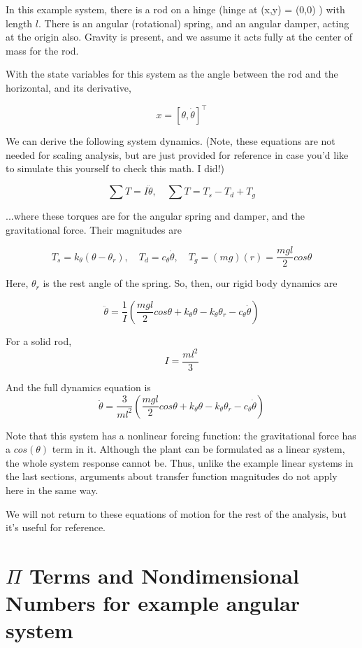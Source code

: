 \documentclass[12pt,letterpaper]{article}
\begin{document}
In this example system, there is a rod on a hinge (hinge at (x,y) = (0,0) ) with length $l$.
There is an angular (rotational) spring, and an angular damper, acting at the origin also.
Gravity is present, and we assume it acts fully at the center of mass for the rod.


With the state variables for this system as the angle between the rod and the horizontal, and its derivative,

\[
x = [\theta, \dot \theta]^\top
\]

We can derive the following system dynamics. 
(Note, these equations are not needed for scaling analysis, but are just provided for reference in case you'd like to simulate this yourself to check this math. I did!)

\[
\sum T = I \ddot \theta, \quad \sum T = T_s - T_d + T_g
\]

...where these torques are for the angular spring and damper, and the gravitational force. Their magnitudes are

\[
T_s = k_{\theta}(\theta - \theta_r), \quad T_d = c_{\theta} \dot \theta, \quad T_g = (mg)(r) = \frac{mgl}{2} cos \theta
\]

Here, $\theta_r$ is the rest angle of the spring. So, then, our rigid body dynamics are

\[
\ddot \theta = \frac{1}{I} (\frac{mgl}{2} cos \theta + k_{\theta} \theta - k_{\theta} \theta_r - c_{\theta} \dot \theta )
\]

For a solid rod,
\[
I = \frac{m l^2}{3}
\]


And the full dynamics equation is
\begin{equation}\label{eqn:dynamics_soln}
\ddot \theta = \frac{3}{m l^2} (\frac{mgl}{2} cos \theta + k_{\theta} \theta - k_{\theta} \theta_r - c_{\theta} \dot \theta )
\end{equation}

Note that this system has a nonlinear forcing function: the gravitational force has a $cos(\theta)$ term in it.
Although the plant can be formulated as a linear system, the whole system response cannot be.
Thus, unlike the example linear systems in the last sections, arguments about transfer function magnitudes do not apply here in the same way.

We will not return to these equations of motion for the rest of the analysis, but it's useful for reference.

\section{$\Pi$ Terms and Nondimensional Numbers for example angular system}
\end{document}
